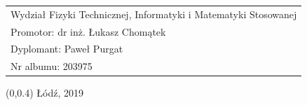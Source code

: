 \documentclass[a4paper,onecolumn,twoside,12pt]{mwrep}
\begin{document}
\begin{titlepage}
	\vspace{7.9cm}
	\begin{center}
		\selectfont
		\hspace{-1cm}
		\begin{tabular}{l}
			Wydział Fizyki Technicznej, Informatyki i Matematyki Stosowanej\\
			Promotor: dr inż. Łukasz Chomątek\\
			Dyplomant: Paweł Purgat\\
			Nr albumu: 203975
		\end{tabular}
	\end{center}
	\vspace{-.5cm}
	\begin{center}
		\selectfont
		\begin{textblock}{13}(0,0.4)
			Łódź, 2019
		\end{textblock}
	\end{center}
\end{titlepage}


\tableofcontents









\listoffigures
\lstlistoflistings
\end{document}
